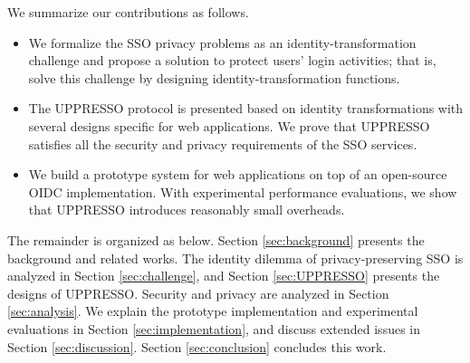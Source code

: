 %
%
We summarize our contributions as follows.
\vspace{-\topsep}\begin{itemize}
\setlength{\topsep}{0pt}
\setlength{\partopsep}{0pt}
\setlength{\itemsep}{0pt}
\setlength{\parsep}{0pt}
\setlength{\parskip}{0pt}
\item We formalize the SSO privacy problems as an identity-transformation challenge and propose a  solution to protect users' login activities;
that is, solve this challenge by designing identity-transformation functions.
\item
The UPPRESSO protocol is presented based on identity transformations with several designs specific for web applications.
We prove that UPPRESSO satisfies all the security and privacy requirements of the SSO services.


\item
We build a prototype system for web applications on top of an open-source OIDC implementation. With experimental performance evaluations, we show that UPPRESSO introduces reasonably small overheads.
\end{itemize}

The remainder is organized as below.
Section \ref{sec:background} presents
    the background and related works.
The identity dilemma of privacy-preserving SSO is analyzed  in Section \ref{sec:challenge},
    and Section \ref{sec:UPPRESSO} presents the designs of UPPRESSO.
Security and privacy are analyzed in Section \ref{sec:analysis}.
We explain the prototype implementation and experimental evaluations in Section \ref{sec:implementation},
 and discuss extended issues in Section \ref{sec:discussion}.
Section \ref{sec:conclusion} concludes this work.

